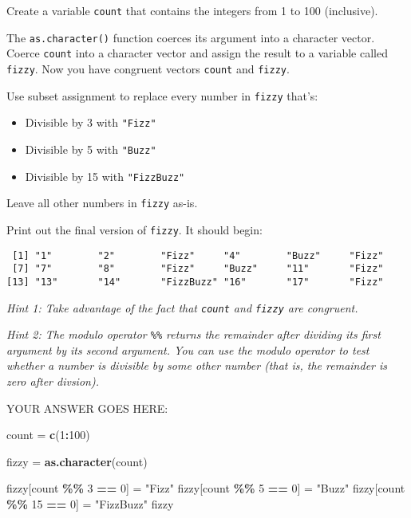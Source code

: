 \documentclass[
]{article}
\newenvironment{Shaded}{\begin{snugshade}}{\end{snugshade}}
\newcommand{\DecValTok}[1]{\textcolor[rgb]{0.00,0.00,0.81}{#1}}
\newcommand{\KeywordTok}[1]{\textcolor[rgb]{0.13,0.29,0.53}{\textbf{#1}}}
\newcommand{\NormalTok}[1]{#1}
\newcommand{\OperatorTok}[1]{\textcolor[rgb]{0.81,0.36,0.00}{\textbf{#1}}}
\newcommand{\StringTok}[1]{\textcolor[rgb]{0.31,0.60,0.02}{#1}}
\providecommand{\tightlist}{%
  \setlength{\itemsep}{0pt}\setlength{\parskip}{0pt}}
\begin{document}
Create a variable \texttt{count} that contains the integers from 1 to
100 (inclusive).

The \texttt{as.character()} function coerces its argument into a
character vector. Coerce \texttt{count} into a character vector and
assign the result to a variable called \texttt{fizzy}. Now you have
congruent vectors \texttt{count} and \texttt{fizzy}.

Use subset assignment to replace every number in \texttt{fizzy} that's:

\begin{itemize}
\tightlist
\item
  Divisible by 3 with \texttt{"Fizz"}
\item
  Divisible by 5 with \texttt{"Buzz"}
\item
  Divisible by 15 with \texttt{"FizzBuzz"}
\end{itemize}

Leave all other numbers in \texttt{fizzy} as-is.

Print out the final version of \texttt{fizzy}. It should begin:

\begin{verbatim}
 [1] "1"        "2"        "Fizz"     "4"        "Buzz"     "Fizz"
 [7] "7"        "8"        "Fizz"     "Buzz"     "11"       "Fizz"
[13] "13"       "14"       "FizzBuzz" "16"       "17"       "Fizz"
\end{verbatim}

\emph{Hint 1: Take advantage of the fact that \texttt{count} and
\texttt{fizzy} are congruent.}

\emph{Hint 2: The modulo operator \texttt{\%\%} returns the remainder
after dividing its first argument by its second argument. You can use
the modulo operator to test whether a number is divisible by some other
number (that is, the remainder is zero after divsion).}

YOUR ANSWER GOES HERE:

\begin{Shaded}
\begin{Highlighting}[]
\NormalTok{count =}\StringTok{ }\KeywordTok{c}\NormalTok{(}\DecValTok{1}\OperatorTok{:}\DecValTok{100}\NormalTok{)}

\NormalTok{fizzy =}\StringTok{ }\KeywordTok{as.character}\NormalTok{(count)}

\NormalTok{fizzy[count }\OperatorTok{\%\%}\StringTok{ }\DecValTok{3} \OperatorTok{==}\StringTok{ }\DecValTok{0}\NormalTok{] =}\StringTok{ "Fizz"}
\NormalTok{fizzy[count }\OperatorTok{\%\%}\StringTok{ }\DecValTok{5} \OperatorTok{==}\StringTok{ }\DecValTok{0}\NormalTok{] =}\StringTok{ "Buzz"}
\NormalTok{fizzy[count }\OperatorTok{\%\%}\StringTok{ }\DecValTok{15} \OperatorTok{==}\StringTok{ }\DecValTok{0}\NormalTok{] =}\StringTok{ "FizzBuzz"}
\NormalTok{fizzy}
\end{Highlighting}
\end{Shaded}
\end{document}
